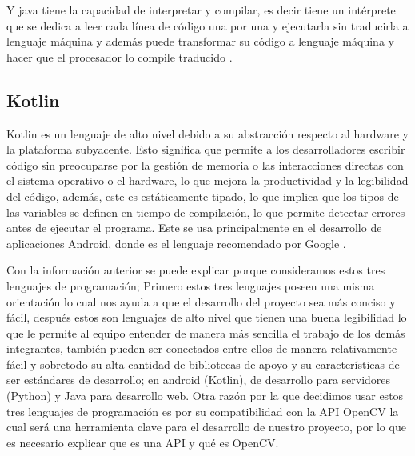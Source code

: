Y java tiene la capacidad de interpretar y compilar, es decir tiene un intérprete que se dedica a leer cada línea de código una por una y ejecutarla sin traducirla a lenguaje máquina y además puede transformar su código  a lenguaje máquina y hacer que el procesador lo compile traducido \cite{CitaD13}. 


\subsection{Kotlin}

Kotlin es un lenguaje de alto nivel debido a su abstracción respecto al hardware y la plataforma subyacente. Esto significa que permite a los desarrolladores escribir código sin preocuparse por la gestión de memoria o las interacciones directas con el sistema operativo o el hardware, lo que mejora la productividad y la legibilidad del código, además, este es estáticamente tipado, lo que implica que los tipos de las variables se definen en tiempo de compilación, lo que permite detectar errores antes de ejecutar el programa. Este se usa principalmente en el desarrollo de aplicaciones Android, donde es el lenguaje recomendado por Google \cite{CitaD14}.

Con la información anterior se puede explicar porque consideramos estos tres lenguajes de programación; Primero estos tres lenguajes poseen una misma orientación lo cual nos ayuda a que el desarrollo del proyecto sea más conciso y fácil, después estos son lenguajes de alto nivel que tienen una buena legibilidad lo que le permite al equipo entender de manera más sencilla el trabajo de los demás integrantes, también pueden ser conectados entre ellos de manera relativamente fácil y sobretodo su alta cantidad de bibliotecas de apoyo y su características de ser  estándares de desarrollo; en android (Kotlin), de desarrollo para servidores (Python) y Java para desarrollo web.
Otra razón por la que decidimos usar estos tres lenguajes de programación es por su compatibilidad con la API OpenCV la cual será una herramienta clave para el desarrollo de nuestro proyecto, por lo que es necesario explicar que es una API y qué es OpenCV.
